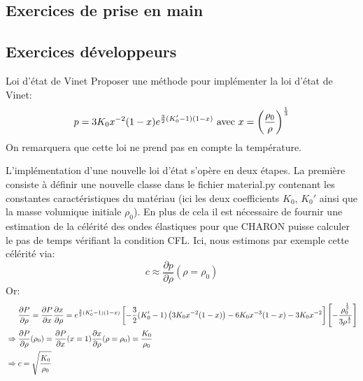 \documentclass[10pt]{book}
\begin{document}
\begin{appendices}
\chapter{Exercices de prise en main}
\section{Exercices développeurs}\label{Section:Exercices développeurs}
\begin{Exercice}{Loi d'état de Vinet} Proposer une méthode pour implémenter la loi d'état de Vinet:
$$p=3K_{0}x^{-2}(1-x)e^{\frac{3}{2}(K_{0}'-1)(1-x)} \text{ avec } x=\left(\dfrac{\rho_{0}}{\rho}\right)^{\frac{1}{3}}$$
On remarquera que cette loi ne prend pas en compte la température.
\end{Exercice}
\begin{Correction}{
L'implémentation d'une nouvelle loi d'état s'opère en deux étapes. La première consiste à définir une nouvelle classe dans le fichier material.py contenant les constantes caractéristiques du matériau (ici les deux coefficients $K_{0}$, $K_{0}'$ ainsi que la masse volumique initiale $\rho_{0}$). En plus de cela il est nécessaire de fournir une estimation de la célérité des ondes élastiques pour que CHARON puisse calculer le pas de temps vérifiant la condition CFL. Ici, nous estimons par exemple cette célérité via:
$$c\approx \dfrac{\partial p}{\partial \rho}(\rho=\rho_{0})$$
Or:
$$\begin{aligned}
&\dfrac{\partial P}{\partial \rho}=\dfrac{\partial P}{\partial x}\dfrac{\partial x}{\partial \rho}=e^{\frac{3}{2}(K_{0}'-1)(1-x)}\left[-\dfrac{3}{2}(K_{0}'-1)\left(3K_{0}x^{-2}(1-x)\right)-6K_{0}x^{-3}(1-x)-3K_{0}x^{-2}\right]\left[-\dfrac{\rho_{0}^{\frac{1}{3}}}{3\rho^{\frac{4}{3}}}\right]\\
\; \Rightarrow \; &\dfrac{\partial P}{\partial \rho}(\rho_{0})=\dfrac{\partial P}{\partial x}(x=1)\dfrac{\partial x}{\partial \rho}(\rho=\rho_{0})=\dfrac{K_{0}}{\rho_{0}}\\
\; \Rightarrow \; &c=\sqrt{\dfrac{K_{0}}{\rho_{0}}}
\end{aligned}$$
}\end{Correction}


\end{appendices}
\end{document}
